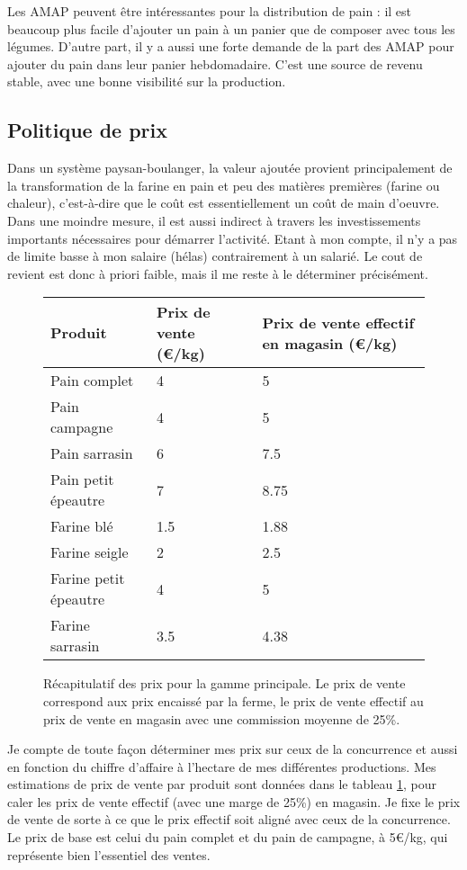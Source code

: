 \documentclass{book}
\begin{document}
Les AMAP peuvent être intéressantes pour la distribution de pain : il est beaucoup plus facile d’ajouter un pain à un panier que de composer avec tous les légumes. D’autre part, il y a aussi une forte demande de la part des AMAP pour ajouter du pain dans leur panier hebdomadaire. C’est une source de revenu stable, avec une bonne visibilité sur la production. 

\subsection{Politique de prix}
\label{part:prix}

Dans un système paysan-boulanger, la valeur ajoutée provient principalement de la transformation de la farine en pain et peu des matières premières (farine ou chaleur), c’est-à-dire que le coût est essentiellement un coût de main d’oeuvre. Dans une moindre mesure, il est aussi indirect à travers les investissements importants nécessaires pour démarrer l’activité. Etant à mon compte, il n’y a pas de limite basse à mon salaire (hélas) contrairement à un salarié. Le cout de revient est donc à priori faible, mais il me reste à le déterminer précisément. 

\begin{figure}[h!]
\center
\footnotesize
\begin{tabular}{ | p{3cm} | p{3cm}| p{3cm}|}
\hline
	 Produit & Prix de vente (\euro{}/kg) & Prix de vente effectif en magasin (\euro{}/kg) \\ \hline
	 \hline
	Pain complet & 4 & 5 \\ \hline
	Pain campagne & 4 & 5 \\ \hline
	Pain sarrasin & 6 & 7.5 \\ \hline
	Pain petit épeautre & 7 & 8.75 \\ \hline
	\hline
	Farine blé & 1.5 & 1.88 \\ \hline
	Farine seigle & 2 & 2.5 \\ \hline
	Farine petit épeautre & 4 & 5 \\ \hline
	Farine sarrasin & 3.5 & 4.38 \\ \hline
\end{tabular}
\caption{Récapitulatif des prix pour la gamme principale. Le prix de vente correspond aux prix encaissé par la ferme, le prix de vente effectif au prix de vente en magasin avec une commission moyenne de 25\%.}
\label{tab:prix}
\end{figure}

Je compte de toute façon déterminer mes prix sur ceux de la concurrence et aussi en fonction du chiffre d’affaire à l’hectare de mes différentes productions. Mes estimations de prix de vente par produit sont données dans le tableau \ref{tab:prix}, pour caler les prix de vente effectif (avec une marge de 25\%) en magasin. Je fixe le prix de vente de sorte à ce que le prix effectif soit aligné avec ceux de la concurrence. Le prix de base est celui du pain complet et du pain de campagne, à 5\euro{}/kg, qui représente bien l’essentiel des ventes.
\end{document}
